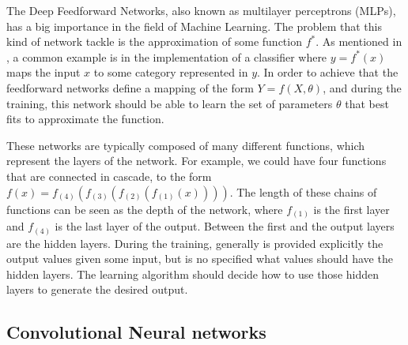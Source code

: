 The Deep Feedforward Networks, also known as multilayer perceptrons (MLPs), has a big importance in the field of Machine Learning. The problem that this kind of network tackle is the approximation of some function \begin{math} f^{*}\end{math}. As mentioned in \cite{goodfellow_bengio_courville_2017}, a common example is in the implementation of a classifier where \begin{math} y = f^{*}(x)\end{math} maps the input \begin{math} x \end{math} to some category represented in \begin{math} y \end{math}. In order to achieve that the feedforward networks define a mapping of the form \begin{math} Y = f(X, \theta)\end{math}, and during the training, this network should be able to learn the set of parameters \begin{math} \theta \end{math} that best fits to approximate the function.

These networks are typically composed of many different functions, which represent the layers of the network. For example, we could have four functions that are connected in cascade, to the form \begin{math} f(x) = f_{(4)}(f_{(3)}(f_{(2)}(f_{(1)}(x)))) \end{math}. The length of these chains of functions can be seen as the depth of the network, where \begin{math} f_{(1)} \end{math} is the first layer and \begin{math} f_{(4)} \end{math} is the last layer of the output. Between the first and the output layers are the hidden layers. During the training, generally is provided explicitly the output values given some input, but is no specified what values should have the hidden layers. The learning algorithm should decide how to use those hidden layers to generate the desired output.

\subsection{Convolutional Neural networks}

